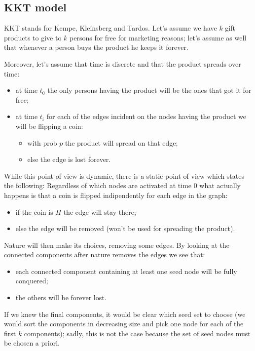 \subsection{KKT model}

KKT stands for Kempe, Kleinsberg and Tardos.
Let's assume we have $k$ gift products to give to $k$ persons for free for marketing reasons; let's assume as well that whenever a person buys the product he keeps it forever.

Moreover, let's assume that time is discrete and that the product spreads over time:
\begin{itemize}
    \item at time $t_0$ the only persons having the product will be the ones that got it for free;
    \item at time $t_i$ for each of the edges incident on the nodes having the product we will be flipping a coin:
    \begin{itemize}
        \item with prob $p$ the product will spread on that edge;
        \item else the edge is lost forever.
    \end{itemize}  
\end{itemize} 

While this point of view is dynamic, there is a static point of view which states the following:
Regardless of which nodes are activated at time 0 what actually happens is that a coin is flipped indipendently for each edge in the graph: 
%
\begin{itemize}
    \item if the coin is $H$ the edge will stay there;
    \item else the edge will be removed (won't be used for spreading the product).
\end{itemize}

Nature will then make its choices, removing some edges. 
By looking at the connected components after nature removes the edges we see that:
%
\begin{itemize}
    \item each connected component containing at least one seed node will be fully conquered;
    \item the others will be forever lost.
\end{itemize}  

If we knew the final components, it would be clear which seed set to choose (we would sort the components in decreasing size and pick one node for each of the first $k$ components); sadly, this is not the case because the set of seed nodes must be chosen a priori.

